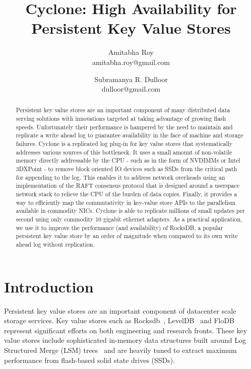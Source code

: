 \documentclass[twocolumn]{article}
\begin{document}
\title{Cyclone: High Availability for Persistent Key Value Stores}
\author{Amitabha Roy \\ amitabha.roy@gmail.com 
	     \and Subramanya R. Dulloor \\ dulloor@gmail.com}

\date{}
\maketitle


\begin{abstract}
\vspace{0.05in}
Persistent key value stores are an important component of many distributed data
serving solutions with innovations targeted at taking advantage of growing flash
speeds. Unfortunately their performance is hampered by the need to maintain and
replicate a write ahead log to guarantee availability in the face of machine and
storage failures. Cyclone is a replicated log plug-in for key value stores that
systematically addresses various sources of this bottleneck. It uses a small
amount of non-volatile memory directly addressable by the CPU - such as in the
form of NVDIMMs or Intel 3DXPoint - to remove block oriented IO devices such as
SSDs from the critical path for appending to the log. This enables it to address
network overheads using an implementation of the RAFT consensus protocol that is
designed around a userspace network stack to relieve the CPU of the burden of
data copies. Finally, it provides a way to efficiently map the commutativity in
key-value store APIs to the parallelism available in commodity NICs.  Cyclone is
able to replicate millions of small updates per second using only commodity 10
gigabit ethernet adapters. As a practical application, we use it to improve the
performance (and availability) of RocksDB, a popular persistent key value store
by an order of magnitude when compared to its own write ahead log without
replication.
\end{abstract}

\section{Introduction}
Persistent key value stores are an important component of datacenter scale
storage services. Key value stores such as Rocksdb~\cite{rocksdb},
LevelDB~\cite{leveldb} and FloDB~\cite{flodb} represent significant efforts on
both engineering and research fronts. These key value stores include
sophisticated in-memory data structures built around Log Structured Merge (LSM)
trees~\cite{lsmtree} and are heavily tuned to extract maximum performance from
flash-based solid state drives (SSDs).
\end{document}
